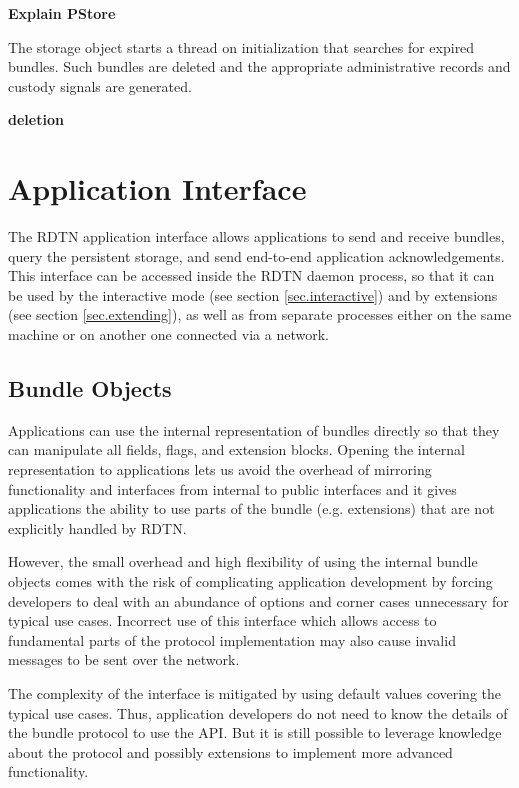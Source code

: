 \documentclass[a4paper]{article}
\begin{document}
{\bf Explain PStore}

The storage object starts a thread on initialization that searches
for expired bundles. Such bundles are deleted and the appropriate administrative
records and custody signals are generated.

{\bf deletion}

\section{Application Interface}\label{sec.appif}

The RDTN application interface allows applications to send and receive bundles,
query the persistent storage, and send end-to-end application acknowledgements.
This interface can be accessed inside the RDTN daemon process, so that it can be
used by the interactive mode (see section \ref{sec.interactive}) and by
extensions (see section \ref{sec.extending}), as well as from separate processes
either on the same machine or on another one connected via a network.

\subsection{Bundle Objects}\label{sec.bundle-obj}

Applications can use the internal representation of bundles directly so that
they can manipulate all fields, flags, and extension blocks. Opening the
internal representation to applications lets us avoid the overhead of mirroring
functionality and interfaces from internal to public interfaces and it gives
applications the ability to use parts of the bundle (e.g. extensions) that are
not explicitly handled by RDTN.

However, the small overhead and high flexibility of using the internal bundle
objects comes with the risk of complicating application development by forcing
developers to deal with an abundance of options and corner cases unnecessary for
typical use cases. Incorrect use of this interface which allows access to
fundamental parts of the protocol implementation may also cause invalid messages
to be sent over the network.

The complexity of the interface is mitigated by using default values covering the
typical use cases. Thus, application developers do not need to know the details
of the bundle protocol to use the API. But it is still possible to leverage
knowledge about the protocol and possibly extensions to implement more advanced
functionality.
\end{document}
